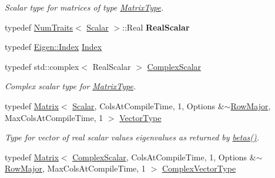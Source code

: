 \begin{DoxyCompactItemize}
\begin{DoxyCompactList}\small\item\em Scalar type for matrices of type \hyperlink{group___eigenvalues___module_a56f4b9823bb9a267de3aaf48428cd247}{Matrix\+Type}. \end{DoxyCompactList}\item 
\mbox{\label{group___eigenvalues___module_a2fb7acd2ce5c1e73025a1d2d4bb27107}} 
typedef \hyperlink{group___core___module_struct_eigen_1_1_num_traits}{Num\+Traits}$<$ \hyperlink{group___eigenvalues___module_afb318d0b097ff8dd5a7410d31317ca47}{Scalar} $>$\+::Real {\bfseries Real\+Scalar}
\item 
typedef \hyperlink{namespace_eigen_a62e77e0933482dafde8fe197d9a2cfde}{Eigen\+::\+Index} \hyperlink{group___eigenvalues___module_a46a0ff3841059479ec314e56a5645302}{Index}
\item 
typedef std\+::complex$<$ Real\+Scalar $>$ \hyperlink{group___eigenvalues___module_abdec07af91db1345bb4c74066e3d0ea7}{Complex\+Scalar}
\begin{DoxyCompactList}\small\item\em Complex scalar type for \hyperlink{group___eigenvalues___module_a56f4b9823bb9a267de3aaf48428cd247}{Matrix\+Type}. \end{DoxyCompactList}\item 
typedef \hyperlink{group___core___module_class_eigen_1_1_matrix}{Matrix}$<$ \hyperlink{group___eigenvalues___module_afb318d0b097ff8dd5a7410d31317ca47}{Scalar}, Cols\+At\+Compile\+Time, 1, Options \&$\sim$\hyperlink{group__enums_ggaacded1a18ae58b0f554751f6cdf9eb13acfcde9cd8677c5f7caf6bd603666aae3}{Row\+Major}, Max\+Cols\+At\+Compile\+Time, 1 $>$ \hyperlink{group___eigenvalues___module_a5aa3d1390c2b0d455c1c9b8b3101b119}{Vector\+Type}
\begin{DoxyCompactList}\small\item\em Type for vector of real scalar values eigenvalues as returned by \hyperlink{group___eigenvalues___module_abeaa6f56cee367b83fd09d428462ca0c}{betas()}. \end{DoxyCompactList}\item 
typedef \hyperlink{group___core___module_class_eigen_1_1_matrix}{Matrix}$<$ \hyperlink{group___eigenvalues___module_abdec07af91db1345bb4c74066e3d0ea7}{Complex\+Scalar}, Cols\+At\+Compile\+Time, 1, Options \&$\sim$\hyperlink{group__enums_ggaacded1a18ae58b0f554751f6cdf9eb13acfcde9cd8677c5f7caf6bd603666aae3}{Row\+Major}, Max\+Cols\+At\+Compile\+Time, 1 $>$ \hyperlink{group___eigenvalues___module_acfd144329aca76882069da2fc5d53ef5}{Complex\+Vector\+Type}

\end{DoxyCompactItemize}
